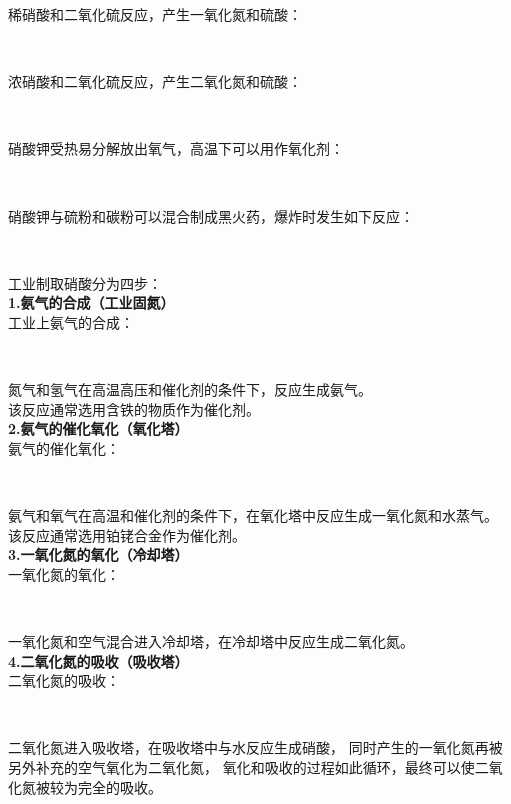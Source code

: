 \documentclass[UTF8]{ctexart}
\begin{document}
\newpage

    稀硝酸和二氧化硫反应，产生一氧化氮和硫酸：
    \begin{center}
        \\[4mm]
    \end{center}
    浓硝酸和二氧化硫反应，产生二氧化氮和硫酸：
    \begin{center}
        \\[4mm]
    \end{center}
    硝酸钾受热易分解放出氧气，高温下可以用作氧化剂：
    \begin{center}
        \\[4mm]
    \end{center}
    硝酸钾与硫粉和碳粉可以混合制成黑火药，爆炸时发生如下反应：
    \begin{center}
        \\[4mm]
    \end{center}
    工业制取硝酸分为四步：\\[3mm]
    \textbf{1.氨气的合成（工业固氮）}\\[2mm]
    工业上氨气的合成：
    \begin{center}
        \\[3mm]
    \end{center}
    氮气和氢气在高温高压和催化剂的条件下，反应生成氨气。\\[1mm]
    该反应通常选用含铁的物质作为催化剂。\\[5mm]
    \textbf{2.氨气的催化氧化（氧化塔）}\\[2mm]
    氨气的催化氧化：
    \begin{center}
        \\[3mm]
    \end{center}
    氨气和氧气在高温和催化剂的条件下，在氧化塔中反应生成一氧化氮和水蒸气。\\[1mm]
    该反应通常选用铂铑合金作为催化剂。\\[5mm]
    \textbf{3.一氧化氮的氧化（冷却塔）}\\[2mm]
    一氧化氮的氧化：
    \begin{center}
        \\[3mm]
    \end{center}
    一氧化氮和空气混合进入冷却塔，在冷却塔中反应生成二氧化氮。\\[5mm]
    \textbf{4.二氧化氮的吸收（吸收塔）}\\[2mm]
    二氧化氮的吸收：
    \begin{center}
        \\[3mm]
    \end{center}
    二氧化氮进入吸收塔，在吸收塔中与水反应生成硝酸，
    同时产生的一氧化氮再被另外补充的空气氧化为二氧化氮，
    氧化和吸收的过程如此循环，最终可以使二氧化氮被较为完全的吸收。
\end{document}
